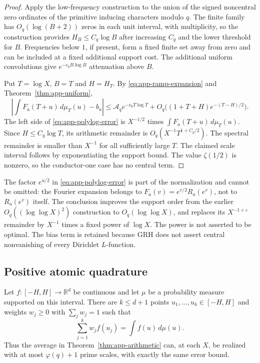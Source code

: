 \begin{proof}
Apply the low-frequency construction to the union of the signed noncentral
zero ordinates of the primitive inducing characters modulo $q$.  The finite
family has $O_q(\log(B+2))$ zeros in each unit interval, with multiplicity,
so the construction provides $H_B\le C_q\log B$ after increasing $C_q$
and the lower threshold for $B$.  Frequencies below $1$, if present, form a
fixed finite set away from zero and can be included at a fixed additional
support cost.  The additional uniform convolutions give
$e^{-c_0B\log B}$ attenuation above $B$.

Put $T=\log X$, $B=T$ and $H=H_T$.  By
\eqref{eq:app-ramp-expansion} and Theorem~\ref{thm:app-uniform},
\[
 \left|\int F_a(T+u)\,d\mu_T(u)-b_a\right|
 \le \mathcal A_q e^{-c_0T\log T}
       +O_q\bigl((1+T+H)e^{-(T-H)/2}\bigr).
\]
The left side of \eqref{eq:app-polylog-error} is $X^{-1/2}$ times
$\int F_a(T+u)\,d\mu_T(u)$.  Since $H\le C_q\log T$, its arithmetic
remainder is $O_q(X^{-1}T^{1+C_q/2})$.  The spectral remainder is smaller
than $X^{-1}$ for all sufficiently large $T$.  The claimed scale interval
follows by exponentiating the support bound.  The value $\zeta(1/2)$ is
nonzero, so the conductor-one case has no central term.
\end{proof}

The factor $e^{u/2}$ in \eqref{eq:app-polylog-error} is part of the
normalization and cannot be omitted: the Fourier expansion belongs to
$F_a(v)=e^{v/2}R_a(e^v)$, not to $R_a(e^v)$ itself.  The conclusion
improves the support order from the earlier $O_q((\log\log X)^2)$
construction to $O_q(\log\log X)$, and replaces its
$X^{-1+\varepsilon}$ remainder by $X^{-1}$ times a fixed power of
$\log X$.  The power is not asserted to be optimal.  The bias term is
retained because GRH does not assert central nonvanishing of every
Dirichlet $L$-function.

\subsection{Positive atomic quadrature}

\begin{corollary}\label{cor:app-atoms}
Let $f:[-H,H]\to\mathbb R^d$ be continuous and let $\mu$ be a probability
measure supported on this interval.  There are $k\le d+1$ points
$u_1,\ldots,u_k\in[-H,H]$ and weights $w_j\ge0$ with
$\sum_jw_j=1$ such that
\[
 \sum_{j=1}^k w_j f(u_j)=\int f(u)\,d\mu(u).
\]
Thus the average in Theorem~\ref{thm:app-arithmetic} can, at each $X$, be
realized with at most $\varphi(q)+1$ prime scales, with exactly the same
error bound.
\end{corollary}

